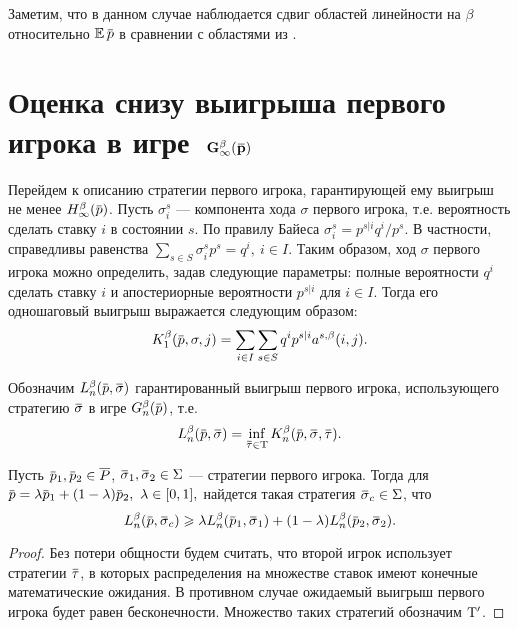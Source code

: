 {Заметим, что в данном случае наблюдается сдвиг областей линейности на $\beta$ относительно $\E \p$ в сравнении с областями из \cite{domansky11}.

\section{Оценка снизу выигрыша первого игрока в игре~$\mathbf{G^\beta_\infty(\p)}$}
\label{ch3:sec:lower-bound}

Перейдем к описанию стратегии первого игрока, гарантирующей ему выигрыш не менее $\High(\p)$.
Пусть $\sigma^s_i$ --- компонента хода $\sigma$ первого игрока, т.е. вероятность сделать ставку $i$ в состоянии $s$.
По правилу Байеса $\sigma^s_i = p^{s|i} q^i / p^s$.
В частности, справедливы равенства $\sum_{s \in S} \sigma^s_i p^s = q^i,\ i \in I$.
Таким образом, ход $\sigma$ первого игрока можно определить, задав следующие параметры: полные вероятности $q^i$ сделать ставку $i$ и апостериорные вероятности $p^{s|i}$ для $i \in I$.
Тогда его одношаговый выигрыш выражается следующим образом:
\begin{equation}
  \label{ch3:lower-bound:eq:K1(q,pi)}
  \K[1](\p, \sigma, j) = \sum_{i \in I} \sum_{s \in S} q^i p^{s|i} \as(i, j).
\end{equation}

Обозначим $\Low[n](\p, \sigmav)$ гарантированный выигрыш первого игрока, использующего стратегию $\sigmav$ в игре $\theG[n](\p)$, т.е.
\[
  \Low[n](\p, \sigmav) = \inf_{\tauv \in \Tau} \K[n](\p, \sigmav, \tauv).
\]

\begin{lemma}
  \label{ch3:lower-bound:lemma:convex-combination}
  Пусть $\p_1, \p_2 \in \MM$, $\sigmav_1, \sigmav_2 \in \Sigma$ --- стратегии первого игрока.
  Тогда для $\p = \lambda \p_1 + (1-\lambda) \p_2,\ \lambda \in [0, 1],$ найдется такая стратегия $\sigmav_c \in \Sigma$, что
  \[
    \Low[n](\p, \sigmav_c) \geqslant
    \lambda \Low[n](\p_1, \sigmav_1) + (1-\lambda) \Low[n](\p_2, \sigmav_2).
  \]
\end{lemma}
\begin{proof}
  Без потери общности будем считать, что второй игрок использует стратегии $\tauv$, в которых распределения на множестве ставок имеют конечные математические ожидания.
  В противном случае ожидаемый выигрыш первого игрока будет равен бесконечности.
  Множество таких стратегий обозначим $\mathrm{T}'$.
  

\end{proof}}
